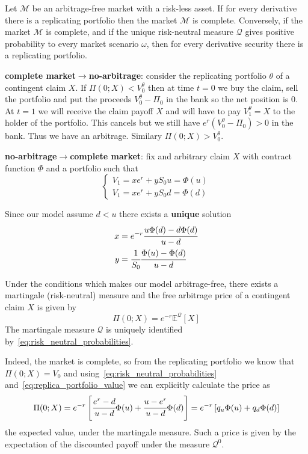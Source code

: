 \documentclass[12pt,a4paper]{book}
\begin{document}
Let $\mathcal{M}$ be an arbitrage-free market with a risk-less asset. If for every derivative there is a replicating portfolio
then the market $\mathcal{M}$ is complete. Conversely, if the market $\mathcal{M}$ is complete, and if the unique risk-neutral measure $\mathcal{Q}$ gives positive probability to every market scenario $\omega$, then for every derivative security there is a replicating portfolio.%

\textbf{complete market$\rightarrow$no-arbitrage}: consider the replicating portfolio $\theta$ of a contingent claim $X$. If $\Pi(0; X) < V_0^\theta$ then at time $t=0$ we buy the claim, sell the portfolio and put the proceeds $V_0^\theta-\Pi_0$ in the bank so the net position is 0. At $t=1$ we will receive the claim payoff $X$ and will have to pay $V_1^\theta =X$  to the holder of the portfolio. This cancels but we still have $e^r(V_0^\theta-\Pi_0)>0$ in the bank. Thus we have an arbitrage. Similary $\Pi(0; X) > V_0^\theta$.
	
\textbf{no-arbitrage$\rightarrow$complete market}: fix and arbitrary claim $X$ with contract function $\Phi$ and a portfolio such that
\begin{equation*}
\begin{cases}
V_1 = x e^r + yS_0u = \Phi(u)\\
V_1 = x e^r + yS_0d = \Phi(d)
\end{cases}
\end{equation*}
			
Since our model assume $d<u$ there exists a \textbf{unique} solution
\begin{equation}
\begin{aligned}
x &= e^{-r}\cfrac{u\Phi(d)-d\Phi(d)}{u-d} \\
y &= \cfrac{1}{S_0}\cfrac{\Phi(u)-\Phi(d)}{u-d}
\end{aligned}
\label{eq:replica_portfolio_value}
\end{equation}

Under the conditions which makes our model arbitrage-free, there exists a martingale (risk-neutral) measure and the free arbitrage price of a contingent claim $X$ is given by 
\begin{equation*}
\Pi(0; X) = e^{-r}\mathbb{E}^{\mathcal{Q}}[X]
\end{equation*} 
The martingale measure $\mathcal{Q}$ is uniquely identified by~\ref{eq:risk_neutral_probabilities}.
		
Indeed, the market is complete, so from the replicating portfolio we know that $\Pi(0;X) = V_0$ and using~\ref{eq:risk_neutral_probabilities} and~\ref{eq:replica_portfolio_value} we can explicitly calculate the price as
\begin{equation*}
\Pi(0;X) = e^{-r}\left[\cfrac{e^r-d}{u-d}\Phi(u)+\cfrac{u-e^r}{u-d}\Phi(d)\right] = e^{-r}\left[q_u\Phi(u)+q_d\Phi(d)\right]
\end{equation*}
the expected value, under the martingale measure.
Such a price is given by the expectation of the discounted payoff under the measure $\mathcal{Q}^0$.
		
\end{document}
